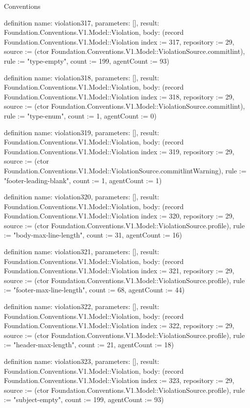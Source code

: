 \begin{lexlean}{Conventions}
\begin{semanticmodule}
definition{
  name: violation317,
  parameters: [],
  result: Foundation.Conventions.V1.Model::Violation,
  body: (record Foundation.Conventions.V1.Model::Violation {index := 317, repository := 29, source := (ctor Foundation.Conventions.V1.Model::ViolationSource.commitlint), rule := "type-empty", count := 199, agentCount := 93})
}

definition{
  name: violation318,
  parameters: [],
  result: Foundation.Conventions.V1.Model::Violation,
  body: (record Foundation.Conventions.V1.Model::Violation {index := 318, repository := 29, source := (ctor Foundation.Conventions.V1.Model::ViolationSource.commitlint), rule := "type-enum", count := 1, agentCount := 0})
}

definition{
  name: violation319,
  parameters: [],
  result: Foundation.Conventions.V1.Model::Violation,
  body: (record Foundation.Conventions.V1.Model::Violation {index := 319, repository := 29, source := (ctor Foundation.Conventions.V1.Model::ViolationSource.commitlintWarning), rule := "footer-leading-blank", count := 1, agentCount := 1})
}

definition{
  name: violation320,
  parameters: [],
  result: Foundation.Conventions.V1.Model::Violation,
  body: (record Foundation.Conventions.V1.Model::Violation {index := 320, repository := 29, source := (ctor Foundation.Conventions.V1.Model::ViolationSource.profile), rule := "body-max-line-length", count := 31, agentCount := 16})
}

definition{
  name: violation321,
  parameters: [],
  result: Foundation.Conventions.V1.Model::Violation,
  body: (record Foundation.Conventions.V1.Model::Violation {index := 321, repository := 29, source := (ctor Foundation.Conventions.V1.Model::ViolationSource.profile), rule := "footer-max-line-length", count := 68, agentCount := 44})
}

definition{
  name: violation322,
  parameters: [],
  result: Foundation.Conventions.V1.Model::Violation,
  body: (record Foundation.Conventions.V1.Model::Violation {index := 322, repository := 29, source := (ctor Foundation.Conventions.V1.Model::ViolationSource.profile), rule := "header-max-length", count := 21, agentCount := 18})
}

definition{
  name: violation323,
  parameters: [],
  result: Foundation.Conventions.V1.Model::Violation,
  body: (record Foundation.Conventions.V1.Model::Violation {index := 323, repository := 29, source := (ctor Foundation.Conventions.V1.Model::ViolationSource.profile), rule := "subject-empty", count := 199, agentCount := 93})
}


\end{semanticmodule}
\end{lexlean}
